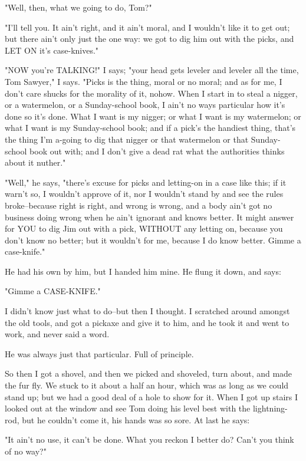 "Well, then, what we going to do, Tom?"

"I'll tell you.  It ain't right, and it ain't moral, and I wouldn't like
it to get out; but there ain't only just the one way:  we got to dig him
out with the picks, and LET ON it's case-knives."

"NOW you're TALKING!"  I says; "your head gets leveler and leveler all
the time, Tom Sawyer," I says.  "Picks is the thing, moral or no moral;
and as for me, I don't care shucks for the morality of it, nohow.  When I
start in to steal a nigger, or a watermelon, or a Sunday-school book, I
ain't no ways particular how it's done so it's done.  What I want is my
nigger; or what I want is my watermelon; or what I want is my
Sunday-school book; and if a pick's the handiest thing, that's the thing
I'm a-going to dig that nigger or that watermelon or that Sunday-school
book out with; and I don't give a dead rat what the authorities thinks
about it nuther."

"Well," he says, "there's excuse for picks and letting-on in a case like
this; if it warn't so, I wouldn't approve of it, nor I wouldn't stand by
and see the rules broke--because right is right, and wrong is wrong, and
a body ain't got no business doing wrong when he ain't ignorant and knows
better.  It might answer for YOU to dig Jim out with a pick, WITHOUT any
letting on, because you don't know no better; but it wouldn't for me,
because I do know better.  Gimme a case-knife."

He had his own by him, but I handed him mine.  He flung it down, and
says:

"Gimme a CASE-KNIFE."

I didn't know just what to do--but then I thought.  I scratched around
amongst the old tools, and got a pickaxe and give it to him, and he took
it and went to work, and never said a word.

He was always just that particular.  Full of principle.

So then I got a shovel, and then we picked and shoveled, turn about, and
made the fur fly.  We stuck to it about a half an hour, which was as long
as we could stand up; but we had a good deal of a hole to show for it.
When I got up stairs I looked out at the window and see Tom doing his
level best with the lightning-rod, but he couldn't come it, his hands was
so sore.  At last he says:

"It ain't no use, it can't be done.  What you reckon I better do?  Can't
you think of no way?"

